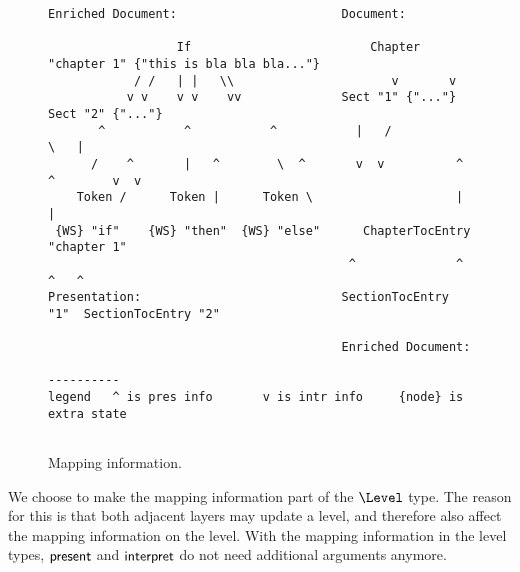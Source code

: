 \begin{figure}
\begin{center}
\begin{center}
\begin{footnotesize}
\begin{verbatim}
Enriched Document:                       Document:                                                                                            
                                                                                            
                  If                         Chapter "chapter 1" {"this is bla bla bla..."} 
            / /   | |   \\                      v       v                                     
           v v    v v    vv              Sect "1" {"..."}     Sect "2" {"..."}                
       ^           ^           ^           |   /                    \   |                            
      /    ^       |   ^        \  ^       v  v          ^  ^        v  v                          
    Token /      Token |      Token \                    |  |                             
 {WS} "if"    {WS} "then"  {WS} "else"      ChapterTocEntry "chapter 1"                     
                                          ^              ^                 ^   ^              
Presentation:                            SectionTocEntry "1"  SectionTocEntry "2"           
                                                                                            
                                         Enriched Document:                                 

----------                                                                        
legend   ^ is pres info       v is intr info     {node} is extra state            
                                                                                  
\end{verbatim}  
\end{footnotesize}                                                                  
\end{center}                                                                      
\caption{Mapping information.}\label{info}                          
\end{center}                                                                      
\end{figure}



We choose to make the mapping information part of the $\Level$ type. The reason for this is that both adjacent layers may update a level, and therefore also affect the mapping information on the level.  With the mapping information in the level types, ${\mathsf {present}}$ and ${\mathsf {interpret}}$ do not need additional arguments anymore.
\ec


